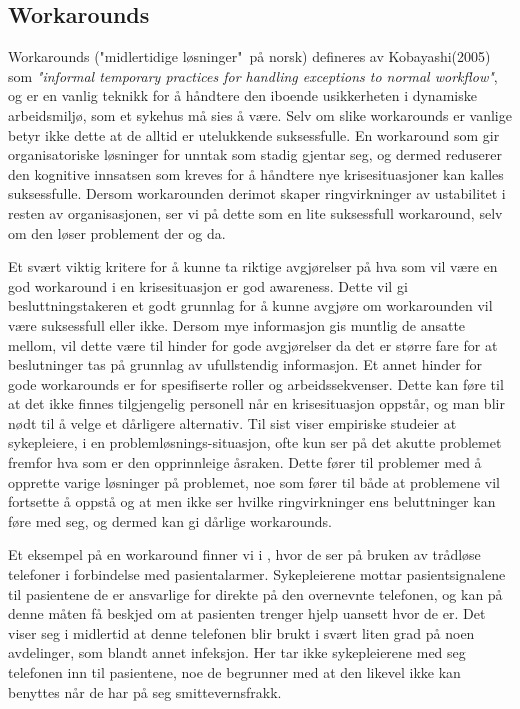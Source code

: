 \subsection{Workarounds}
\label{chp: workarounds}

Workarounds ("midlertidige løsninger"\ på norsk) defineres av Kobayashi(2005) som \emph{"informal temporary practices for handling exceptions to normal workflow"}, og er en vanlig teknikk for å håndtere den iboende usikkerheten i dynamiske arbeidsmiljø, som et sykehus må sies å være. Selv om slike workarounds er vanlige betyr ikke dette at de alltid er utelukkende suksessfulle. En workaround som gir organisatoriske løsninger for unntak som stadig gjentar seg, og dermed reduserer den kognitive innsatsen som kreves for å håndtere nye krisesituasjoner kan kalles suksessfulle. Dersom workarounden derimot skaper ringvirkninger av ustabilitet i resten av organisasjonen, ser vi på dette som en lite suksessfull workaround, selv om den løser problement der og da. \cite{Kobayashi05}

\noindent
Et svært viktig kritere for å kunne ta riktige avgjørelser på hva som vil være en god workaround i en krisesituasjon er god awareness. Dette vil gi besluttningstakeren et godt grunnlag for å kunne avgjøre om workarounden vil være suksessfull eller ikke. Dersom mye informasjon gis muntlig de ansatte mellom, vil dette være til hinder for gode avgjørelser da det er større fare for at beslutninger tas på grunnlag av ufullstendig informasjon. Et annet hinder for gode workarounds er for spesifiserte roller og arbeidssekvenser. Dette kan føre til at det ikke finnes tilgjengelig personell når en krisesituasjon oppstår, og man blir nødt til å velge et dårligere alternativ. Til sist viser empiriske studeier at sykepleiere, i en problemløsnings-situasjon, ofte kun ser på det akutte problemet fremfor hva som er den opprinnleige åsraken. Dette fører til problemer med å opprette varige løsninger på problemet, noe som fører til både at problemene vil fortsette å oppstå og at men ikke ser hvilke ringvirkninger ens beluttninger kan føre med seg, og dermed kan gi dårlige workarounds. \cite{Kobayashi05}

\noindent
Et eksempel på en workaround finner vi i \cite{KlemetsRedundancy}, hvor de ser på bruken av trådløse telefoner i forbindelse med pasientalarmer. Sykepleierene mottar pasientsignalene til pasientene de er ansvarlige for direkte på den overnevnte telefonen, og kan på denne måten få beskjed om at pasienten trenger hjelp uansett hvor de er. Det viser seg i midlertid at denne telefonen blir brukt i svært liten grad på noen avdelinger, som blandt annet infeksjon. Her tar ikke sykepleierene med seg telefonen inn til pasientene, noe de begrunner med at den likevel ikke kan benyttes når de har på seg smittevernsfrakk. \cite{KlemetsRedundancy}

